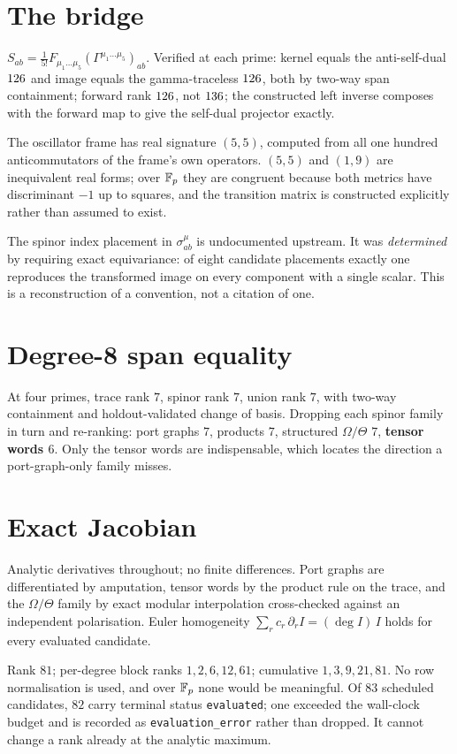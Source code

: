 \documentclass[aps,prl,onecolumn,superscriptaddress,nofootinbib]{revtex4-2}
\begin{document}
\section{The bridge}
$S_{ab}=\frac{1}{5!}F_{\mu_1\ldots\mu_5}(\Gamma^{\mu_1\ldots\mu_5})_{ab}$.
Verified at each prime: kernel equals the anti-self-dual $126$ and
image equals the gamma-traceless $126$, both by two-way span
containment; forward rank $126$, not $136$; the
constructed left inverse composes with the forward map to give the self-dual
projector exactly.

The oscillator frame has real signature $(5,5)$, computed from all one hundred
anticommutators of the frame's own operators. $(5,5)$ and $(1,9)$ are
inequivalent real forms; over $\mathbb{F}_p$ they are congruent because both metrics have
discriminant $-1$ up to squares, and the transition matrix is constructed
explicitly rather than assumed to exist.

The spinor index placement in $\sigma^\mu_{ab}$ is undocumented upstream. It was
\emph{determined} by requiring exact equivariance: of eight candidate placements
exactly one reproduces the transformed image on every component with a single
scalar. This is a reconstruction of a convention, not a citation of one.

\section{Degree-8 span equality}
At four primes, trace rank $7$, spinor rank $7$, union rank $7$, with two-way
containment and holdout-validated change of basis. Dropping each spinor family in
turn and re-ranking: port graphs $7$, products $7$, structured $\Omega/\Theta$
$7$, \textbf{tensor words $6$}. Only the tensor words are indispensable, which
locates the direction a port-graph-only family misses.

\section{Exact Jacobian}
Analytic derivatives throughout; no finite differences. Port graphs are
differentiated by amputation, tensor words by the product rule on the trace, and
the $\Omega/\Theta$ family by exact modular interpolation cross-checked against
an independent polarisation. Euler homogeneity
$\sum_r c_r\,\partial_r I = (\deg I)\,I$ holds for every evaluated candidate.

Rank $81$; per-degree block ranks $1,2,6,12,61$; cumulative $1,3,9,21,81$. No row
normalisation is used, and over $\mathbb{F}_p$ none would be meaningful. Of $83$ scheduled
candidates, $82$ carry terminal status \texttt{evaluated}; one exceeded the
wall-clock budget and is recorded as \texttt{evaluation\_error} rather than
dropped. It cannot change a rank already at the analytic maximum.
\end{document}
